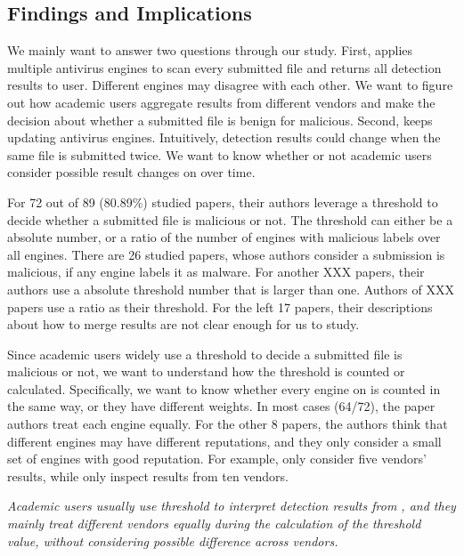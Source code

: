\subsection{Findings and Implications}
We mainly want to answer two questions through our study.
First, \vt{} applies multiple antivirus engines to scan every submitted file 
and returns all detection results to user.
Different engines may disagree with each other.
We want to figure out how academic users aggregate results from different vendors 
and make the decision about whether a submitted file is benign for malicious. 
Second, \vt{} keeps updating antivirus engines. 
Intuitively, detection results could change when the same file is submitted twice.
We want to know whether or not academic users consider 
possible result changes on \vt{} over time.   


For 72 out of 89 (80.89\%) studied papers, 
their authors leverage a threshold to decide whether a submitted file is 
malicious or not. 
The threshold can either be a absolute number, 
or a ratio of the number of engines with malicious labels over all engines.
There are 26 studied papers, 
whose authors consider a submission is malicious, 
if any engine labels it as malware. 
For another {\color{red} XXX} papers, their authors 
use a absolute threshold number that is larger than one. 
Authors of {\color{red} XXX} papers use a ratio as their threshold.  
For the left 17 papers, their descriptions about how to merge \vt{} results 
are not clear enough for us to study. 

Since academic users widely use a threshold 
to decide a submitted file is malicious or not, 
we want to understand how the threshold is counted or calculated. 
Specifically, we want to know whether every engine 
on \vt{} is counted in the same way, or they have different weights.   
In most cases (64/72), the paper authors treat each engine equally.
For the other 8 papers, the authors think that different engines 
may have different reputations, 
and they only consider a small set of engines with 
good reputation.
For example, \citet{five-vendors-1} only consider five vendors' results, 
while \citet{arp2014drebin} only inspect results from ten vendors. 

{\it{
Academic users usually use threshold to interpret detection results from \vt{}, 
and they mainly treat different vendors equally during the calculation of the threshold value, 
without considering possible difference across vendors.  
}}


